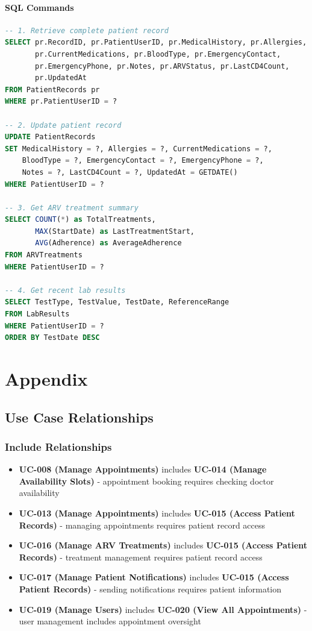 \documentclass[12pt,a4paper]{article}
\begin{document}
\paragraph{SQL Commands}

\begin{lstlisting}[language=SQL]
-- 1. Retrieve complete patient record
SELECT pr.RecordID, pr.PatientUserID, pr.MedicalHistory, pr.Allergies, 
       pr.CurrentMedications, pr.BloodType, pr.EmergencyContact, 
       pr.EmergencyPhone, pr.Notes, pr.ARVStatus, pr.LastCD4Count,
       pr.UpdatedAt
FROM PatientRecords pr
WHERE pr.PatientUserID = ?

-- 2. Update patient record
UPDATE PatientRecords
SET MedicalHistory = ?, Allergies = ?, CurrentMedications = ?,
    BloodType = ?, EmergencyContact = ?, EmergencyPhone = ?,
    Notes = ?, LastCD4Count = ?, UpdatedAt = GETDATE()
WHERE PatientUserID = ?

-- 3. Get ARV treatment summary
SELECT COUNT(*) as TotalTreatments, 
       MAX(StartDate) as LastTreatmentStart,
       AVG(Adherence) as AverageAdherence
FROM ARVTreatments
WHERE PatientUserID = ?

-- 4. Get recent lab results
SELECT TestType, TestValue, TestDate, ReferenceRange
FROM LabResults
WHERE PatientUserID = ?
ORDER BY TestDate DESC
\end{lstlisting}

\section{Appendix}

\subsection{Use Case Relationships}

\subsubsection{Include Relationships}
\begin{itemize}
    \item \textbf{UC-008 (Manage Appointments)} includes \textbf{UC-014 (Manage Availability Slots)} - appointment booking requires checking doctor availability
    \item \textbf{UC-013 (Manage Appointments)} includes \textbf{UC-015 (Access Patient Records)} - managing appointments requires patient record access
    \item \textbf{UC-016 (Manage ARV Treatments)} includes \textbf{UC-015 (Access Patient Records)} - treatment management requires patient record access
    \item \textbf{UC-017 (Manage Patient Notifications)} includes \textbf{UC-015 (Access Patient Records)} - sending notifications requires patient information
    \item \textbf{UC-019 (Manage Users)} includes \textbf{UC-020 (View All Appointments)} - user management includes appointment oversight
\end{itemize}
\end{document}
